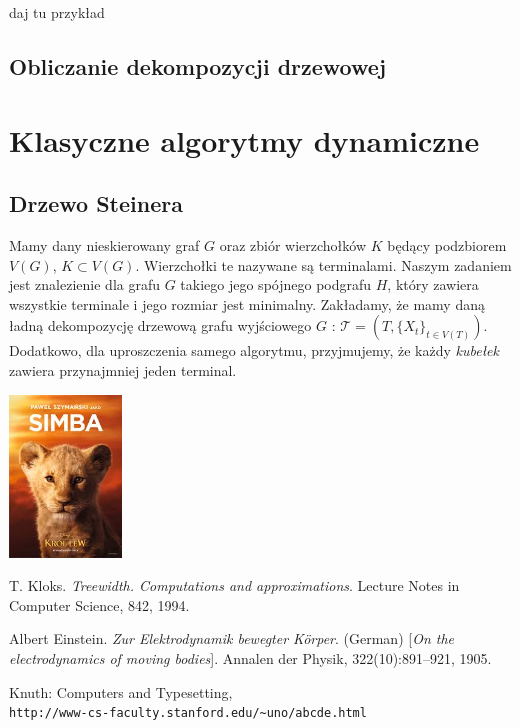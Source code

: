 \documentclass[12pt, oneside]{report}
\begin{document}
daj tu przykład
		\section{Obliczanie dekompozycji drzewowej}


\newpage
  	\chapter{Klasyczne algorytmy dynamiczne}
    	\section{Drzewo Steinera}

Mamy dany nieskierowany graf $G$ oraz zbiór wierzchołków $K$ będący podzbiorem $V(G)$, $K \subset V(G)$. Wierzchołki te nazywane są terminalami.
Naszym zadaniem jest znalezienie dla grafu $G$ takiego jego spójnego podgrafu $H$, który zawiera wszystkie terminale i jego rozmiar jest minimalny.
Zakładamy, że mamy daną ładną dekompozycję drzewową grafu wyjściowego $G$ : $\mathcal{T} = (T, \{X_t\}_{t \in V(T)})$. Dodatkowo, dla uproszczenia samego algorytmu, przyjmujemy, że każdy \emph{kubełek} zawiera przynajmniej jeden terminal.

\centering
{
	\includegraphics[width=3cm]{images.jpg}
}

\newpage
	\begin{thebibliography}{9}
			T. Kloks. 
			\textit{Treewidth. Computations and approximations}. 
			Lecture Notes in Computer Science, 842, 1994.
 
			Albert Einstein. 
			\textit{Zur Elektrodynamik bewegter K{\"o}rper}. (German) 
			[\textit{On the electrodynamics of moving bodies}]. 
			Annalen der Physik, 322(10):891–921, 1905.
 
			Knuth: Computers and Typesetting,
			\\\texttt{http://www-cs-faculty.stanford.edu/\~{}uno/abcde.html}
	\end{thebibliography} 
\end{document}
